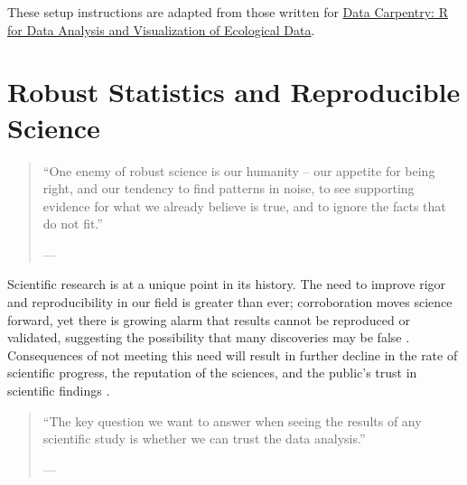 \documentclass[
  12pt, krantz2,
]{krantz}
\theoremstyle{definition}
\theoremstyle{definition}
\theoremstyle{definition}
\newcommand{\1}{\mathbbm{1}}
\begin{document}
These setup instructions are adapted from those written for \href{http://www.datacarpentry.org/R-ecology-lesson/}{Data Carpentry: R
for Data Analysis and Visualization of Ecological
Data}.

\hypertarget{robust}{%
\chapter{Robust Statistics and Reproducible Science}\label{robust}}

\begin{quote}
``One enemy of robust science is our humanity -- our appetite for
being right, and our tendency to find patterns in noise, to see supporting
evidence for what we already believe is true, and to ignore the facts that do
not fit.''

--- \citet{naturenews_2015}
\end{quote}

Scientific research is at a unique point in its history. The need to improve
rigor and reproducibility in our field is greater than ever; corroboration moves
science forward, yet there is growing alarm that results cannot be reproduced or
validated, suggesting the possibility that many discoveries may be false
\citep{baker2016there}. Consequences of not meeting this need will result in further
decline in the rate of scientific progress, the reputation of the sciences, and
the public's trust in scientific findings \citep{munafo2017manifesto, naturenews2_2015}.

\begin{quote}
``The key question we want to answer when seeing the results of any scientific
study is whether we can trust the data analysis.''

--- \citet{peng2015reproducibility}
\end{quote}
\end{document}
